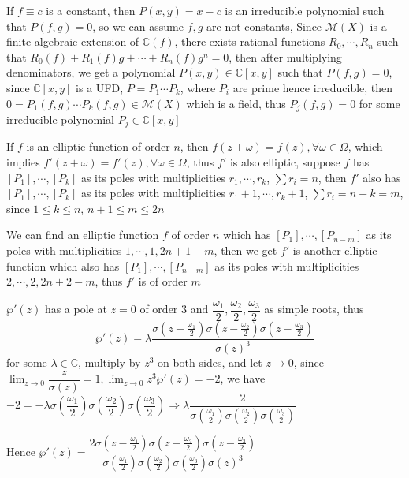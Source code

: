 \documentclass[../main.tex]{subfiles}
\begin{document}
\begin{problem}
If $f\equiv c$ is a constant, then $P(x,y)=x-c$ is an irreducible polynomial such that $P(f,g)=0$, so we can assume $f,g$ are not constants, Since $\mathcal{M}(X)$ is a finite algebraic extension of $\mathbb{C}(f)$, there exists rational functions $R_0,\cdots,R_n$ such that $R_0(f)+R_1(f)g+\cdots+R_n(f)g^n=0$, then after multiplying denominators, we get a polynomial $P(x,y)\in \mathbb{C}[x,y]$ such that $P(f,g)=0$, since $\mathbb{C}[x,y]$ is a UFD, $P=P_1\cdots P_k$, where $P_i$ are prime hence irreducible, then $0=P_1(f,g)\cdots P_k(f,g)\in \mathcal{M}(X)$ which is a field, thus $P_j(f,g)=0$ for some irreducible polynomial $P_j\in \mathbb{C}[x,y]$
\end{problem}

\begin{problem}
If $f$ is an elliptic function of order $n$, then $f(z+\omega)=f(z), \forall \omega\in\Omega$, which implies $f'(z+\omega)=f'(z), \forall \omega\in\Omega$, thus $f'$ is also elliptic, suppose $f$ has $[P_1],\cdots,[P_{k}]$ as its poles with multiplicities $r_1,\cdots,r_k$, $\sum r_i=n$, then $f'$ also has $[P_1],\cdots,[P_{k}]$ as its poles with multiplicities $r_1+1,\cdots,r_k+1$, $\sum r_i=n+k=m$, since $1\leq k\leq n$, $n+1\leq m\leq 2n$ \par
We can find an elliptic function $f$ of order $n$ which has $[P_1],\cdots,[P_{n-m}]$ as its poles with multiplicities $1,\cdots,1,2n+1-m$, then we get $f'$ is another elliptic function which also has $[P_1],\cdots,[P_{n-m}]$ as its poles with multiplicities $2,\cdots,2,2n+2-m$, thus $f'$ is of order $m$
\end{problem}

\begin{problem}
$\wp'(z)$ has a pole at $z=0$ of order $3$ and $\dfrac{\omega_1}{2},\dfrac{\omega_2}{2},\dfrac{\omega_3}{2}$ as simple roots, thus \[
\wp'(z)=\lambda\dfrac{\sigma\left(z-\frac{\omega_1}{2}\right)\sigma\left(z-\frac{\omega_2}{2}\right)\sigma\left(z-\frac{\omega_3}{2}\right)}{\sigma(z)^3}\] for some $\lambda\in\mathbb{C}$, multiply by $z^3$ on both sides, and let $z\rightarrow 0$, since $\displaystyle\lim_{z\rightarrow 0}\dfrac{z}{\sigma(z)}=1, \lim_{z\rightarrow 0}z^3\wp'(z)=-2$, we have $-2=-\lambda\sigma\left(\dfrac{\omega_1}{2}\right)\sigma\left(\dfrac{\omega_2}{2}\right)\sigma\left(\dfrac{\omega_3}{2}\right)\Rightarrow \lambda \dfrac{2}{\sigma\left(\frac{\omega_1}{2}\right)\sigma\left(\frac{\omega_2}{2}\right)\sigma\left(\frac{\omega_3}{2}\right)}$\par
Hence $\wp'(z)=\dfrac{2\sigma\left(z-\frac{\omega_1}{2}\right)\sigma\left(z-\frac{\omega_2}{2}\right)\sigma\left(z-\frac{\omega_3}{2}\right)}{\sigma\left(\frac{\omega_1}{2}\right)\sigma\left(\frac{\omega_2}{2}\right)\sigma\left(\frac{\omega_3}{2}\right)\sigma(z)^3}$
\end{problem}
\end{document}
